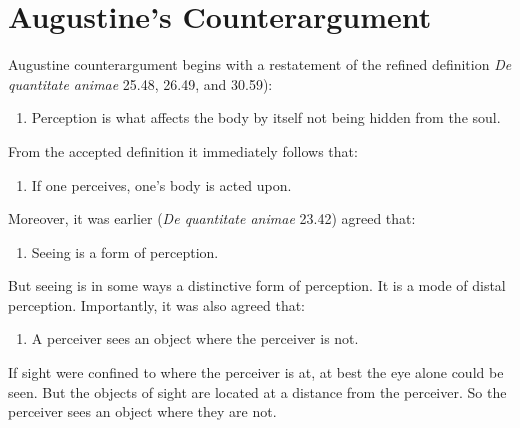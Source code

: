 \documentclass[12pt]{article}
\begin{document}


\section{Augustine's Counterargument} %
\label{sec:augustine_s_counterargument}

Augustine counterargument begins with a restatement of the refined definition \emph{De quantitate animae} 25.48, 26.49, and 30.59):
\begin{enumerate}[1.]
	\item Perception is what affects the body by itself not being hidden from the soul.
\end{enumerate}
From the accepted definition it immediately follows that:
\begin{enumerate}[2.]
	\item If one perceives, one's body is acted upon.
\end{enumerate}
Moreover, it was earlier (\emph{De quantitate animae} 23.42) agreed that:
\begin{enumerate}[3.]
	\item Seeing is a form of perception.
\end{enumerate}
But seeing is in some ways a distinctive form of perception. It is a mode of distal perception. Importantly, it was also agreed that:
\begin{enumerate}[4.]
	\item A perceiver sees an object where the perceiver is not.
\end{enumerate}
If sight were confined to where the perceiver is at, at best the eye alone could be seen. But the objects of sight are located at a distance from the perceiver. So the perceiver sees an object where they are not. 
\end{document}
